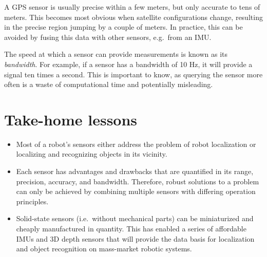 A GPS sensor is usually precise within a few meters, but only accurate to tens of meters. This becomes most obvious when satellite configurations change, resulting in the precise region jumping by a couple of meters. In practice, this can be avoided by fusing this data with other sensors, e.g.\ from an IMU.

The speed at which a sensor can provide measurements is known as its  \textsl{bandwidth}. For example, if a sensor has a bandwidth of 10 Hz, it will provide a signal ten times a second. This is important to know, as querying the sensor more often is a waste of computational time and potentially misleading.


\section*{Take-home lessons}
\begin{itemize}
\item Most of a robot's sensors either address the problem of robot localization or localizing and recognizing objects in its vicinity.
\item Each sensor has advantages and drawbacks that are quantified in its range, precision, accuracy, and bandwidth. Therefore, robust solutions to a problem can only be achieved by combining multiple sensors with differing operation principles.
\item Solid-state sensors (i.e.\ without mechanical parts) can be miniaturized and cheaply manufactured in quantity. This has enabled a series of affordable IMUs and 3D depth sensors that will provide the data basis for localization and object recognition on mass-market robotic systems.
\end{itemize}

